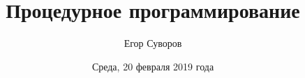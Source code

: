 \documentclass[utf8,xcolor=table]{beamer}
\title{Процедурное программирование}
\author{Егор Суворов}
\institute[СПбГУ]{Курс <<Парадигмы и языки программирования>>, группа 18.Б09-пу}
\date[20.02.2019]{Среда, 20 февраля 2019 года}
\begin{document}
\begin{frame}
\titlepage
\end{frame}


\end{document}
